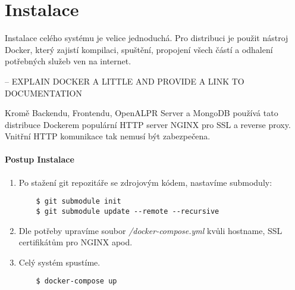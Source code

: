 
\chapter{Instalace} \label{analyza}

Instalace celého systému je velice jednoduchá. Pro distribuci je použit nástroj
Docker, který zajistí kompilaci, spuštění, propojení všech částí a odhalení
potřebných služeb ven na internet.

-- EXPLAIN DOCKER A LITTLE AND PROVIDE A LINK TO DOCUMENTATION

Kromě Backendu, Frontendu, OpenALPR Server a MongoDB používá tato distribuce
Dockerem populární HTTP server NGINX pro SSL a reverse proxy. Vnitřní HTTP komunikace
tak nemusí být zabezpečena.

\subsubsection*{Postup Instalace}

\begin{enumerate}
  \item Po stažení git repozitáře se zdrojovým kódem, nastavíme submoduly:\\
  \begin{lstlisting}
    $ git submodule init
    $ git submodule update --remote --recursive
  \end{lstlisting}
  \item Dle potřeby upravíme soubor \textit{/docker-compose.yml} kvůli hostname, SSL certifikátům pro NGINX apod.
  \item Celý systém spustíme.\\
  \begin{lstlisting}
    $ docker-compose up
  \end{lstlisting}
\end{enumerate}

